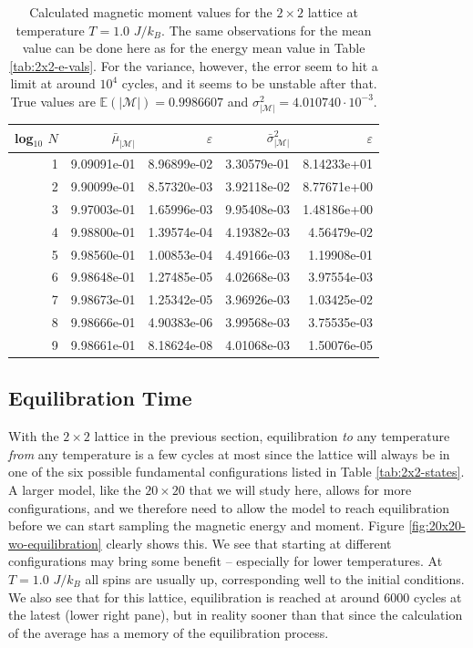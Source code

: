 \documentclass[]{article}
\begin{document}
\begin{table}[!h]
	\caption{Calculated magnetic moment values for the $2 \times 2$ lattice at temperature $T=1.0$ $J/k_B$. The same observations for the mean value can be done here as for the energy mean value in Table \ref{tab:2x2-e-vals}. For the variance, however, the error seem to hit a limit at around $10^4$ cycles, and it seems to be unstable after that. True values are $\mathbb{E}(|\mathcal{M}|) = 0.9986607$ and $\sigma_{|\mathcal{M}|}^2 = 4.010740 \cdot 10^{-3}$.}
	\label{tab:2x2-m-vals}
	\begin{center}
		\begin{tabular}{r|rr|rr}
			\toprule
			log$_{10}$ $N$ & $\bar{\mu}_{|\mathcal{M}|}$ & $\varepsilon$ & $\bar{\sigma}^2_{|\mathcal{M}|}$ & $\varepsilon$ \\
			\midrule
				1 & 9.09091e-01 & 8.96899e-02 & 3.30579e-01 & 8.14233e+01 \\
				2 & 9.90099e-01 & 8.57320e-03 & 3.92118e-02 & 8.77671e+00 \\
				3 & 9.97003e-01 & 1.65996e-03 & 9.95408e-03 & 1.48186e+00 \\
				4 & 9.98800e-01 & 1.39574e-04 & 4.19382e-03 & 4.56479e-02 \\
				5 & 9.98560e-01 & 1.00853e-04 & 4.49166e-03 & 1.19908e-01 \\
				6 & 9.98648e-01 & 1.27485e-05 & 4.02668e-03 & 3.97554e-03 \\
				7 & 9.98673e-01 & 1.25342e-05 & 3.96926e-03 & 1.03425e-02 \\
				8 & 9.98666e-01 & 4.90383e-06 & 3.99568e-03 & 3.75535e-03 \\
				9 & 9.98661e-01 & 8.18624e-08 & 4.01068e-03 & 1.50076e-05 \\
			\bottomrule
		\end{tabular}
	\end{center}
\end{table}



\subsection{Equilibration Time} \label{sec:equilibration}

With the $2 \times 2$ lattice in the previous section, equilibration \textit{to} any temperature \textit{from} any temperature is a few cycles at most since the lattice will always be in one of the six possible fundamental configurations listed in Table \ref{tab:2x2-states}. A larger model, like the $20 \times 20$ that we will study here, allows for more configurations, and we therefore need to allow the model to reach equilibration before we can start sampling the magnetic energy and moment. Figure \ref{fig:20x20-wo-equilibration} clearly shows this. We see that starting at different configurations may bring some benefit -- especially for lower temperatures. At $T = 1.0$ $J/k_B$ all spins are usually up, corresponding well to the initial conditions. We also see that for this lattice, equilibration is reached at around 6000 cycles at the latest (lower right pane), but in reality sooner than that since the calculation of the average has a memory of the equilibration process.
\end{document}
